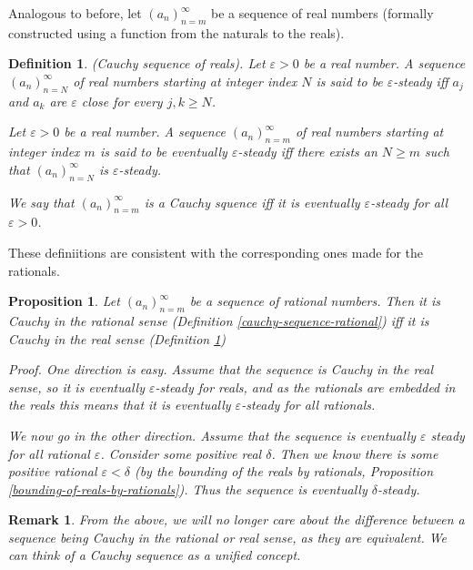 \documentclass{article}
\newtheorem{definition}{Definition}[subsection]
\newtheorem{remark}{Remark}[subsection]
\newtheorem{proposition}{Proposition}[subsection]
\newcommand{\vep}{\varepsilon} %
\let\it\textit
\begin{document}
Analogous to before, let $(a_n)_{n=m}^\infty$ be a sequence 
of real numbers (formally constructed using a function 
from the naturals to the reals).  

\begin{definition}
\label{cauchy-sequence-real}
	(Cauchy sequence of reals). Let $\vep > 0$ 
	be a real number. A sequence 
	$(a_n)_{n=N}^\infty$ of real numbers 
	starting at integer index $N$ is 
	said to be $\vep$-steady iff $a_j$ 
	and $a_k$ are $\vep$ close 
	for every $j,k \geq N$. 

	Let $\vep > 0$ 
	be a real number. A sequence 
	$(a_n)_{n=m}^\infty$ of real numbers 
	starting at integer index $m$ is 
	said to be eventually $\vep$-steady iff 
	there exists an $N \geq m$ such 
	that $(a_n)_{n=N}^\infty$ is 
	$\vep$-steady. 

	We say that $(a_n)_{n=m}^\infty$ 
	is a Cauchy squence iff it is 
	eventually $\vep$-steady 
	for all $\vep > 0$.
\end{definition}

These definiitions are consistent with 
the corresponding ones made for the
rationals.

\begin{proposition}
	Let $(a_n)_{n=m}^\infty$  be a sequence
	of rational numbers. Then it
	is Cauchy in the rational sense (Definition 
	\ref{cauchy-sequence-rational}) iff
	it is Cauchy in the real sense 
	(Definition \ref{cauchy-sequence-real})

	\it{Proof}. One direction is easy. 
	Assume that the sequence is Cauchy 
	in the real sense, so it 
	is eventually $\vep$-steady for reals,
	and as the rationals are embedded 
	in the reals this means that it 
	is eventually $\vep$-steady for all rationals.

	We now go in the other direction. 
	Assume that the sequence is eventually 
	$\vep$ steady for all rational $\vep$. 
	Consider some positive real $\delta$. 
	Then we know there is some positive 
	rational $\vep < \delta$ (by the bounding 
	of the reals by rationals, Proposition 
	\ref{bounding-of-reals-by-rationals}).
	Thus the sequence is eventually 
	$\delta$-steady.
\end{proposition}

\begin{remark}
	From the above, we will no longer care about 
	the difference between a sequence being
	Cauchy in the rational or real sense, 
	as they are equivalent. We can think 
	of a Cauchy sequence as a unified concept.
\end{remark}
\end{document}
